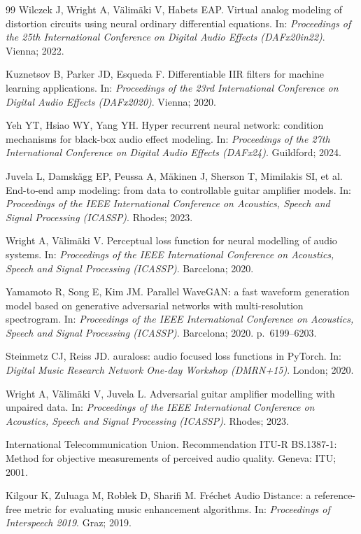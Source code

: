 \documentclass[ENG]{TFUOC}%
\begin{document}
\begin{thebibliography}{99}
 Wilczek J, Wright A, Välimäki V, Habets EAP. Virtual analog modeling of distortion circuits using neural ordinary differential equations. In: \emph{Proceedings of the 25th International Conference on Digital Audio Effects (DAFx20in22)}. Vienna; 2022.

 Kuznetsov B, Parker JD, Esqueda F. Differentiable IIR filters for machine learning applications. In: \emph{Proceedings of the 23rd International Conference on Digital Audio Effects (DAFx2020)}. Vienna; 2020.

 Yeh YT, Hsiao WY, Yang YH. Hyper recurrent neural network: condition mechanisms for black-box audio effect modeling. In: \emph{Proceedings of the 27th International Conference on Digital Audio Effects (DAFx24)}. Guildford; 2024.

 Juvela L, Damskägg EP, Peussa A, Mäkinen J, Sherson T, Mimilakis SI, et al. End-to-end amp modeling: from data to controllable guitar amplifier models. In: \emph{Proceedings of the IEEE International Conference on Acoustics, Speech and Signal Processing (ICASSP)}. Rhodes; 2023.

 Wright A, Välimäki V. Perceptual loss function for neural modelling of audio systems. In: \emph{Proceedings of the IEEE International Conference on Acoustics, Speech and Signal Processing (ICASSP)}. Barcelona; 2020.

 Yamamoto R, Song E, Kim JM. Parallel WaveGAN: a fast waveform generation model based on generative adversarial networks with multi-resolution spectrogram. In: \emph{Proceedings of the IEEE International Conference on Acoustics, Speech and Signal Processing (ICASSP)}. Barcelona; 2020. p.~6199--6203.

 Steinmetz CJ, Reiss JD. auraloss: audio focused loss functions in PyTorch. In: \emph{Digital Music Research Network One-day Workshop (DMRN+15)}. London; 2020.

 Wright A, Välimäki V, Juvela L. Adversarial guitar amplifier modelling with unpaired data. In: \emph{Proceedings of the IEEE International Conference on Acoustics, Speech and Signal Processing (ICASSP)}. Rhodes; 2023.

 International Telecommunication Union. Recommendation ITU-R BS.1387-1: Method for objective measurements of perceived audio quality. Geneva: ITU; 2001.

 Kilgour K, Zuluaga M, Roblek D, Sharifi M. Fréchet Audio Distance: a reference-free metric for evaluating music enhancement algorithms. In: \emph{Proceedings of Interspeech 2019}. Graz; 2019.


\end{thebibliography}
\end{document}

